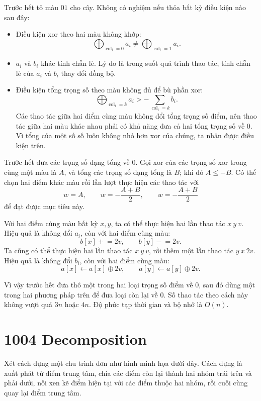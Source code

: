 \documentclass[11pt]{article}
\begin{document}
Trước hết tô màu $01$ cho cây. Không có nghiệm nếu thỏa bất kỳ điều kiện nào
sau đây:
\begin{itemize}
  \item Điều kiện xor theo hai màu không khớp:
  \[
    \bigoplus_{\operatorname{col}_i=0} a_i
    \ne
    \bigoplus_{\operatorname{col}_i=1} a_i.
  \]
  \item $a_i$ và $b_i$ khác tính chẵn lẻ. Lý do là trong suốt quá trình thao
  tác, tính chẵn lẻ của $a_i$ và $b_i$ thay đổi đồng bộ.
  \item Điều kiện tổng trọng số theo màu không đủ để bù phần xor:
  \[
    \bigoplus_{\operatorname{col}_i=k} a_i
    >
    -\sum_{\operatorname{col}_i=k} b_i.
  \]
  Các thao tác giữa hai điểm cùng màu không đổi tổng trọng số điểm, nên thao
  tác giữa hai màu khác nhau phải có khả năng đưa cả hai tổng trọng số về
  $0$. Vì tổng của một số số luôn không nhỏ hơn xor của chúng, ta nhận được
  điều kiện trên.
\end{itemize}

Trước hết đưa các trọng số dạng tổng về $0$. Gọi xor của các trọng số xor
trong cùng một màu là $A$, và tổng các trọng số dạng tổng là $B$; khi đó
$A\le -B$. Có thể chọn hai điểm khác màu rồi lần lượt thực hiện các thao tác
với
\[
  w=A,\qquad w=-\frac{A+B}{2},\qquad w=-\frac{A+B}{2}
\]
để đạt được mục tiêu này.

Với hai điểm cùng màu bất kỳ $x,y$, ta có thể thực hiện hai lần thao tác
$x\ y\ v$. Hiệu quả là không đổi $a_i$, còn với hai điểm cùng màu:
\[
  b[x]\mathrel{+}=2v,\qquad b[y]\mathrel{-}=2v.
\]
Ta cũng có thể thực hiện hai lần thao tác $x\ y\ v$, rồi thêm một lần thao
tác $y\ x\ 2v$. Hiệu quả là không đổi $b_i$, còn với hai điểm cùng màu:
\[
  a[x]\gets a[x]\oplus 2v,\qquad
  a[y]\gets a[y]\oplus 2v.
\]

Vì vậy trước hết đưa thô một trong hai loại trọng số điểm về $0$, sau đó dùng
một trong hai phương pháp trên để đưa loại còn lại về $0$. Số thao tác theo
cách này không vượt quá $3n$ hoặc $4n$. Độ phức tạp thời gian và bộ nhớ là
$O(n)$.

\section{1004 Decomposition}

Xét cách dựng một chu trình đơn như hình minh họa dưới đây. Cách dựng là xuất
phát từ điểm trung tâm, chia các điểm còn lại thành hai nhóm trái trên và
phải dưới, nối xen kẽ điểm hiện tại với các điểm thuộc hai nhóm, rồi cuối
cùng quay lại điểm trung tâm.
\end{document}
